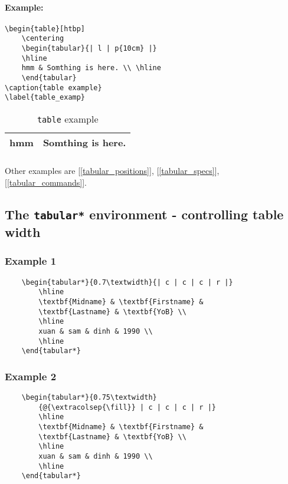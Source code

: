 \paragraph{Example:}
\begin{verbatim}
\begin{table}[htbp]
	\centering
	\begin{tabular}{| l | p{10cm} |}
	\hline
	hmm & Somthing is here. \\ \hline
	\end{tabular}
\caption{table example}
\label{table_examp}
\end{verbatim}

\begin{table}[htbp]
	\centering
	\begin{tabular}{| l | p{10cm} |}
	\hline
	hmm & Somthing is here. \\ \hline
	\end{tabular}
	\caption{\texttt{table} example}
	\label{table_examp}
\end{table}

\subparagraph{} Other examples are [\ref{tabular_positions}], [\ref{tabular_specs}], [\ref{tabular_commands}].

\subsection[\texttt{tabular*}]{The \texttt{tabular*} environment - controlling table width}
\subsubsection{Example 1}
\begin{verbatim}
	\begin{tabular*}{0.7\textwidth}{| c | c | c | r |}
		\hline
		\textbf{Midname} & \textbf{Firstname} &
		\textbf{Lastname} & \textbf{YoB} \\
		\hline
		xuan & sam & dinh & 1990 \\
		\hline
	\end{tabular*}
\end{verbatim}
\subsubsection{Example 2}


\begin{verbatim}
	\begin{tabular*}{0.75\textwidth}
		{@{\extracolsep{\fill}} | c | c | c | r |}
		\hline
		\textbf{Midname} & \textbf{Firstname} &
		\textbf{Lastname} & \textbf{YoB} \\
		\hline
		xuan & sam & dinh & 1990 \\
		\hline
	\end{tabular*}
\end{verbatim}



